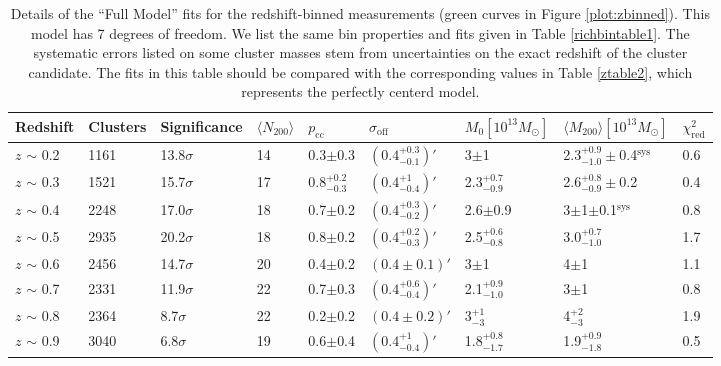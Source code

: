 \begin{landscape}
\begin{table}
\centering
    \caption[Shear Results for Redshift-Binned Clusters (Full Model)]{Details of the ``Full Model'' fits for the redshift-binned measurements (green curves in Figure \ref{plot:zbinned}). This model has 7 degrees of freedom. We list the same bin properties and fits given in Table \ref{richbintable1}. The systematic errors listed on some cluster masses stem from uncertainties on the exact redshift of the cluster candidate. The fits in this table should be compared with the corresponding values in Table \ref{ztable2}, which represents the perfectly centerd model.}
    \begin{tabular}{lllllllll}
      \hline
      Redshift & Clusters & Significance & $\langle N_{200} \rangle$ & $p_{\mathrm{cc}}$ & $\sigma_{\mathrm{off}}$ & $M_0 \left[ 10^{13} M_{\odot}\right]$ & $\langle M_{200} \rangle \left[ 10^{13} M_{\odot}\right]$ & $\chi^2_{\mathrm{red}}$ \\ \hline
      $z$ $\sim$ 0.2 & 1161 & 13.8$\sigma$ & 14 & 0.3$\pm$0.3 & $(0.4^{+0.3}_{-0.1})'$ & 3$\pm$1 & 2.3$^{+0.9}_{-1.0}\pm$0.4$^{\mathrm{sys}}$ & 0.6 \\
      $z$ $\sim$ 0.3 & 1521 & 15.7$\sigma$ & 17 & 0.8$^{+0.2}_{-0.3}$ & $(0.4^{+1}_{-0.4})'$ & 2.3$^{+0.7}_{-0.9}$ & 2.6$^{+0.8}_{-0.9}\pm$0.2 & 0.4 \\
      $z$ $\sim$ 0.4 & 2248 & 17.0$\sigma$ & 18 & 0.7$\pm$0.2 & $(0.4^{+0.3}_{-0.2})'$ & 2.6$\pm$0.9 & 3$\pm$1$\pm$0.1$^{\mathrm{sys}}$ & 0.8 \\
      $z$ $\sim$ 0.5 & 2935 & 20.2$\sigma$ & 18 & 0.8$\pm$0.2 & $(0.4^{+0.2}_{-0.3})'$ & 2.5$^{+0.6}_{-0.8}$ & 3.0$^{+0.7}_{-1.0}$ & 1.7 \\
      $z$ $\sim$ 0.6 & 2456 & 14.7$\sigma$ & 20 & 0.4$\pm$0.2 & $(0.4\pm0.1)'$ & 3$\pm$1 & 4$\pm$1 & 1.1 \\
      $z$ $\sim$ 0.7 & 2331 & 11.9$\sigma$ & 22 & 0.7$\pm$0.3 & $(0.4^{+0.6}_{-0.4})'$ & 2.1$^{+0.9}_{-1.0}$ & 3$\pm$1 & 0.8 \\
      $z$ $\sim$ 0.8 & 2364 & 8.7$\sigma$ & 22 & 0.2$\pm$0.2 & $(0.4\pm0.2)'$ & 3$^{+1}_{-3}$ & 4$^{+2}_{-3}$ & 1.9 \\ 
      $z$ $\sim$ 0.9 & 3040 & 6.8$\sigma$ & 19 & 0.6$\pm$0.4 & $(0.4^{+1}_{-0.4})'$ & 1.8$^{+0.8}_{-1.7}$ & 1.9$^{+0.9}_{-1.8}$ & 0.5 \\
      \hline
    \end{tabular}
    \label{ztable1}
\end{table}


\end{landscape}
